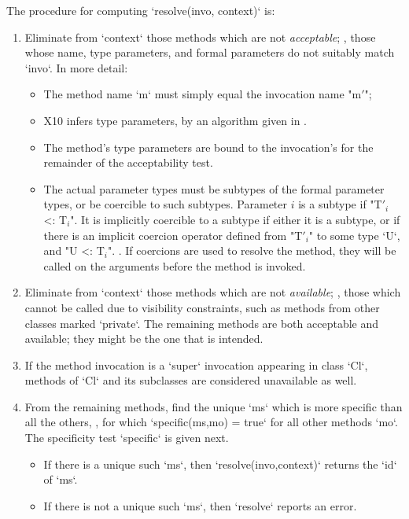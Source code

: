 The procedure for computing \xcd`resolve(invo, context)` is: 
\begin{enumerate}
\item Eliminate from \xcd`context` those methods which are not {\em
      acceptable}; \viz, those whose name, type parameters, and formal parameters
      do not suitably match \xcd`invo`.  In more detail:
      \begin{itemize}
      \item The method name \xcd`m` must simply equal the invocation name \xcdmath"m$'$";
      \item X10 infers type parameters, by an algorithm given in .
      \item The method's type parameters are bound to the invocation's for the
            remainder of the acceptability test.
      \item The actual parameter types must be subtypes of the formal
            parameter types, or be coercible to such subtypes.  Parameter $i$
            is a subtype if \xcdmath"T$'_i$ <: T$_i$".  It is implicitly
            coercible to a subtype if either it is a subtype, or if there is
            an implicit coercion operator 
            defined from \xcdmath"T$'_i$" to some type \xcd`U`, and 
            \xcdmath"U <: T$_i$".  .  If coercions are
            used to resolve the method, they will be called on the arguments
            before the method is invoked.
            
      \end{itemize}
\item Eliminate from \xcd`context` those methods which are not {\em
      available}; \viz, those which cannot be called due to visibility
      constraints, such as methods from other classes marked \xcd`private`.
      The remaining methods are both acceptable and available; they might be
      the one that is intended.
\item If the method invocation is a \xcd`super` invocation appearing in class
      \xcd`Cl`, methods of \xcd`Cl` and its subclasses are considered
      unavailable as well.
      
\item From the remaining methods, find the unique \xcd`ms` which is more specific than all the
      others, \viz, for which \xcd`specific(ms,mo) = true` for all other
      methods \xcd`mo`.
      The specificity test \xcd`specific` is given next.
      \begin{itemize}
      \item If there is a unique such \xcd`ms`, then
            \xcd`resolve(invo,context)` returns the \xcd`id` of \xcd`ms`.  
      \item If there is not a unique such \xcd`ms`, then \xcd`resolve` reports
            an error.
      \end{itemize}

\end{enumerate}

